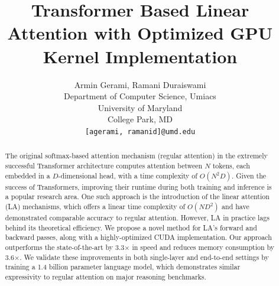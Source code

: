 \documentclass[10pt]{article} %
\title{Transformer Based Linear Attention with Optimized GPU Kernel Implementation}
\author{
  Armin Gerami, Ramani Duraiswami\\
  Department of Computer Science, Umiacs\\
  University of Maryland\\
  College Park, MD \\
  \texttt{[agerami, ramanid]@umd.edu}
}
\begin{document}
\maketitle
\begin{abstract}
The original softmax-based attention mechanism (regular attention) in the extremely successful Transformer architecture computes attention between $N$ tokens, each embedded in a $D$-dimensional head, with a time complexity of $O(N^2D)$. Given the success of Transformers, improving their runtime during both training and inference is a popular research area. One such approach is the introduction of the linear attention (LA) mechanisms, which offers a linear time complexity of $O(ND^2)$ and have demonstrated comparable accuracy to regular attention. However, LA in practice lags behind its theoretical efficiency. We propose a novel method for LA's forward and backward passes, along with a highly-optimized CUDA implementation. Our approach outperforms the state-of-the-art by 3.3× in speed and reduces memory consumption by 3.6×. We validate these improvements in both single-layer and end-to-end settings by training a 1.4 billion parameter language model, which demonstrates similar expressivity to regular attention on major reasoning benchmarks.
\end{abstract}













\newpage
\appendix

\end{document}

